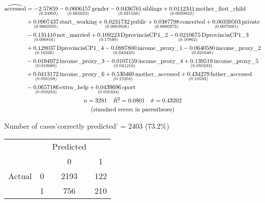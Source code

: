\documentclass[11pt]{beamer}
\begin{document}
\begin{frame}
\scriptsize

\begin{gather}
\begin{split}
\widehat{\rm accessed} &= 
-\underset{(0.24803)}{2.57859}
-\underset{(0.065033)}{0.0606157}\,\mbox{gender}
-\underset{(0.021556)}{0.0436761}\,\mbox{siblings}
+\underset{(0.0059653)}{0.0112341}\,\mbox{mother\_first\_child}\\
& +\underset{(0.0082565)}{0.0907437}\,\mbox{start\_working}
+\underset{(0.0063936)}{0.0231732}\,\mbox{public}
+\underset{(0.0060272)}{0.0387798}\,\mbox{concerted}
+\underset{(0.0075661)}{0.00339503}\,\mbox{private}\\
& -\underset{(0.096816)}{0.131410}\,\mbox{not\_married}
+\underset{(0.17549)}{0.109223}\,\mbox{DprovinciaCP1\_2}
-\underset{(0.16862)}{0.0210675}\,\mbox{DprovinciaCP1\_3}\\
& +\underset{(0.10220)}{0.128037}\,\mbox{DprovinciaCP1\_4}
-\underset{(0.043433)}{0.0997800}\,\mbox{income\_proxy\_1}
-\underset{(0.021648)}{0.0640580}\,\mbox{income\_proxy\_2}\\
& -\underset{(0.019989)}{0.0194972}\,\mbox{income\_proxy\_3}
-\underset{(0.021216)}{0.0107159}\,\mbox{income\_proxy\_4}
+\underset{(0.050233)}{0.139519}\,\mbox{income\_proxy\_5}\\
& +\underset{(0.056198)}{0.0413172}\,\mbox{income\_proxy\_6}
+\underset{(0.15204)}{0.530460}\,\mbox{mother\_accessed}
+\underset{(0.10533)}{0.434279}\,\mbox{father\_accessed}\\
& -\underset{(0.050284)}{0.0657186}\,\mbox{extra\_help}
+\underset{(0.050434)}{0.0439696}\,\mbox{sport}
\end{split}
 \notag \\
n = 3281 \quad \bar{R}^2 = 0.0801 \quad \hat{\sigma} = 0.43202 \notag \\
\centerline{(standard errors in parentheses)} \notag
\end{gather}
\end{frame}

\begin{frame}
\begin{center}
Number of cases'correctly predicted' = 2403 (73.2\%)
\begin{tabular}{cccc}
&&Predicted&\\
&&0&1\\
Actual&0&2193&122\\
&1&756&210\\

\end{tabular}
\end{center}
\end{frame}
\end{document}
